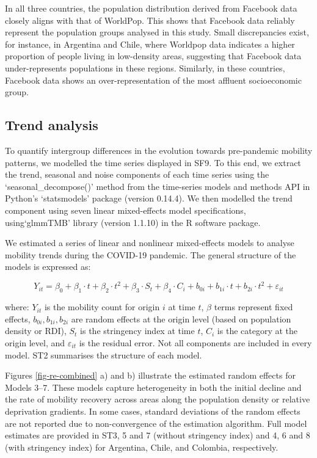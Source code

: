 \documentclass[fleqn,10pt]{wlscirep}
\begin{document}
In all three countries, the population distribution derived from Facebook data closely aligns with that of WorldPop. This shows that Facebook data reliably represent the population groups analysed in this study. Small discrepancies exist, for instance, in Argentina and Chile, where Worldpop data indicates a higher proportion of people living in low-density areas, suggesting that Facebook data under-represents populations in these regions. Similarly, in these countries, Facebook data shows an over-representation of the most affluent socioeconomic group. 

\subsection*{Trend analysis}

To quantify intergroup differences in the evolution towards pre-pandemic mobility patterns, we modelled the time series displayed in SF9. To this end, we extract the trend, seasonal and noise components of each time series using the `seasonal\_decompose()' method from the time-series models and methods API in Python's `statsmodels' package (version 0.14.4). We then modelled the trend component using seven linear mixed-effects model specifications, using`glmmTMB' library (version 1.1.10) in the R software package.

We estimated a series of linear and nonlinear mixed-effects models to analyse mobility trends during the COVID-19 pandemic. The general structure of the models is expressed as:

\begin{equation}\label{model-trend}
Y_{it} = \beta_0 + \beta_1 \cdot {t} + \beta_2 \cdot {t}^2 + \beta_3 \cdot S_{t} + \beta_4 \cdot C_i + b_{0i} + b_{1i} \cdot t + b_{2i} \cdot t^2 + \varepsilon_{it}
\end{equation}

where: $Y_{it}$ is the mobility count for origin $i$ at time $t$, $\beta$ terms represent fixed effects, $b_{0i}, b_{1i}, b_{2i}$ are random effects at the origin level (based on population density or RDI), $S_t$ is the stringency index at time $t$, $C_i$ is the category at the origin level, and $\varepsilon_{it}$ is the residual error. Not all components are included in every model. ST2 summarises the structure of each model.

Figures \ref{fig-re-combined} a) and b) illustrate the estimated random effects for Models 3--7. These models capture heterogeneity in both the initial decline and the rate of mobility recovery across areas along the population density or relative deprivation gradients. In some cases, standard deviations of the random effects are not reported due to non-convergence of the estimation algorithm. Full model estimates are provided in ST3, 5 and 7 (without stringency index) and 4, 6 and 8 (with stringency index) for Argentina, Chile, and Colombia, respectively.
\end{document}
